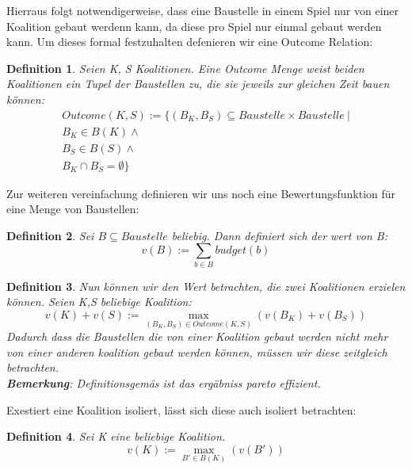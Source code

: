 \documentclass[12pt]{article}
\theoremstyle{break}
\newtheorem{definition}{Definition}
\begin{document}
Hierraus folgt notwendigerweise, dass eine Baustelle in einem Spiel nur von einer Koalition gebaut werdenn kann, da diese pro Spiel nur einmal gebaut werden kann. Um dieses formal festzuhalten defenieren wir eine Outcome Relation:

\begin{definition}
  Seien K, S Koalitionen. Eine Outcome Menge weist beiden Koalitionen ein Tupel der Baustellen zu, die sie jeweils zur gleichen Zeit bauen können:
\begin{eqnarray}
  Outcome(K,S) := \{(B_K,B_S)\subseteq Baustelle\times Baustelle\ |\\B_K\in B(K) \land \\ B_S\in B(S)\land\\B_K\cap B_S =\emptyset \}
\end{eqnarray}
\end{definition}

Zur weiteren vereinfachung definieren wir uns noch eine Bewertungsfunktion für eine Menge von Baustellen:


\begin{definition}
  Sei $B\subseteq Baustelle$ beliebig. Dann definiert sich der wert von B:
  \begin{equation}
    v(B):=\sum_{b\in B} budget(b)
  \end{equation}
\end{definition}


\begin{definition}
  Nun können wir den Wert betrachten, die zwei Koalitionen erzielen können. Seien K,S beliebige Koalition:
\begin{equation}
  v(K) + v(S) := \max_{(B_K, B_S)\in Outcome(K,S)}(v(B_K)+v(B_S))
\end{equation}
Dadurch dass die Baustellen die von einer Koalition gebaut werden nicht mehr von einer anderen koalition gebaut werden können, müssen wir diese zeitgleich betrachten.\\
\textbf{Bemerkung}: Definitionsgemäs ist das ergäbniss pareto effizient.
\end{definition}

Exestiert eine Koalition isoliert, lässt sich diese auch isoliert betrachten:
\begin{definition}
  Sei K eine beliebige Koalition.
  \begin{equation}
    v(K) := \max_{B'\in B(K)}(v(B'))
  \end{equation}
\end{definition}
\end{document}

